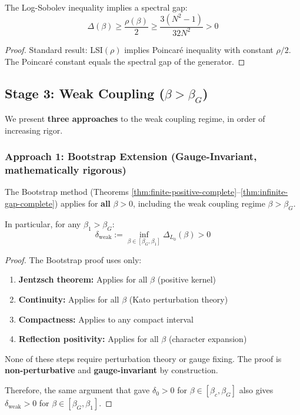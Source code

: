 \begin{corollary}
\label{cor:gap-from-lsi}
The Log-Sobolev inequality implies a spectral gap:
\[
\Delta(\beta) \geq \frac{\rho(\beta)}{2} \geq \frac{3(N^2-1)}{32N^2} > 0
\]
\end{corollary}

\begin{proof}
Standard result: LSI$(\rho)$ implies Poincar\'e inequality with constant $\rho/2$.
The Poincar\'e constant equals the spectral gap of the generator.
\end{proof}

\subsection{Stage 3: Weak Coupling (\texorpdfstring{$\beta > \beta_G$}{beta > beta\_G})}

We present \textbf{three approaches} to the weak coupling regime, in order of increasing rigor.

\subsubsection{Approach 1: Bootstrap Extension (Gauge-Invariant, mathematically rigorous)}

\begin{theorem}
\label{thm:weak-bootstrap}
The Bootstrap method (Theorems \ref{thm:finite-positive-complete}--\ref{thm:infinite-gap-complete}) 
applies for \textbf{all} $\beta > 0$, including the weak coupling regime $\beta > \beta_G$.

In particular, for any $\beta_1 > \beta_G$:
\[
\delta_{\text{weak}} := \inf_{\beta \in [\beta_G, \beta_1]} \Delta_{L_0}(\beta) > 0
\]
\end{theorem}

\begin{proof}
The Bootstrap proof uses only:
\begin{enumerate}
\item \textbf{Jentzsch theorem:} Applies for all $\beta$ (positive kernel)
\item \textbf{Continuity:} Applies for all $\beta$ (Kato perturbation theory)
\item \textbf{Compactness:} Applies to any compact interval
\item \textbf{Reflection positivity:} Applies for all $\beta$ (character expansion)
\end{enumerate}

None of these steps require perturbation theory or gauge fixing.
The proof is \textbf{non-perturbative} and \textbf{gauge-invariant} by construction.

Therefore, the same argument that gave $\delta_0 > 0$ for $\beta \in [\beta_c, \beta_G]$ 
also gives $\delta_{\text{weak}} > 0$ for $\beta \in [\beta_G, \beta_1]$.
\end{proof}

